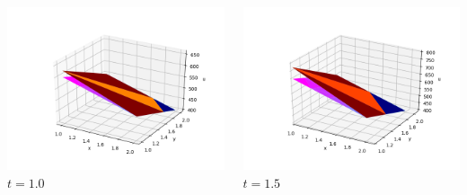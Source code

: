 \documentclass[]{beamer}
\begin{document}
\begin{frame}[t]
\begin{columns}
\begin{center}
			\includegraphics[scale=0.2]{figures/2D_rz_h1m/2D_rz_homog1mat_u_vs_x_10}\\
			$t=1.0$
			\end{center}
			\begin{center}
			\includegraphics[scale=0.2]{figures/2D_rz_h1m/2D_rz_homog1mat_u_vs_x_15}\\
			\tiny$t=1.5$			
			
			\null
			

\end{center}
\end{columns}
\end{frame}
\end{document}
